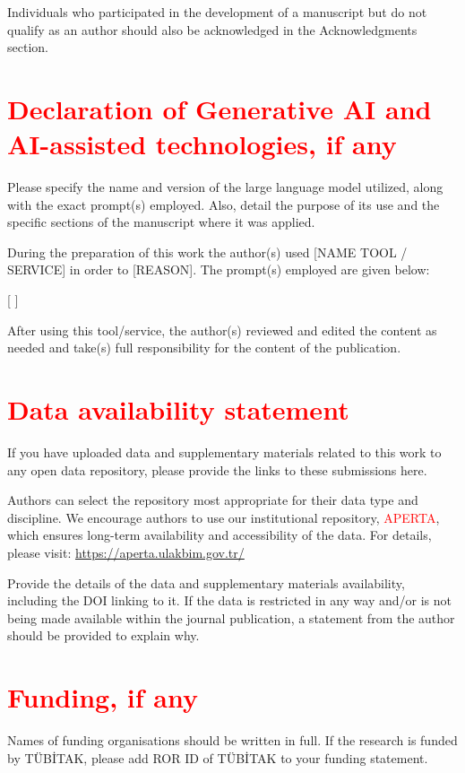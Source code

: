 \documentclass{elektr}
\begin{document}
Individuals who participated in the development of a manuscript but do not qualify as an author should also be acknowledged in the Acknowledgments section.

\section*{\textcolor{red}{Declaration of Generative AI and AI-assisted technologies, if any}}

Please specify the name and version of the large language model utilized, along with the exact prompt(s) employed. Also, detail the purpose of its use and the specific sections of the manuscript where it was applied.

During the preparation of this work the author(s) used [NAME TOOL / SERVICE] in order to [REASON]. The prompt(s) employed are given below:

[         ]

After using this tool/service, the author(s) reviewed and edited the content as needed and take(s) full responsibility for the content of the publication.

\section*{\textcolor{red}{Data availability statement}}

If you have uploaded data and supplementary materials related to this work to any open data repository, please provide the links to these submissions here.

Authors can select the repository most appropriate for their data type and discipline. We encourage authors to use our institutional repository, \textcolor{red}{APERTA}, which ensures long-term availability and accessibility of the data. For details, please visit: \href{https://aperta.ulakbim.gov.tr/}{https://aperta.ulakbim.gov.tr/}

Provide the details of the data and supplementary materials availability, including the DOI linking to it. If the data is restricted in any way and/or is not being made available within the journal publication, a statement from the author should be provided to explain why.

\section*{\textcolor{red}{Funding, if any}}

Names of funding organisations should be written in full. If the research is funded by TÜBİTAK, please add ROR ID of TÜBİTAK to your funding statement. 
\end{document}
